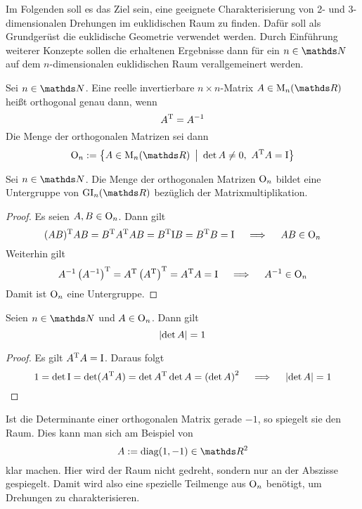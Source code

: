 		Im Folgenden soll es das Ziel sein, eine geeignete Charakterisierung von 2- und 3-dimensionalen Drehungen im euklidischen Raum zu finden.
		Dafür soll als Grundgerüst die euklidische Geometrie verwendet werden.
		Durch Einführung weiterer Konzepte sollen die erhaltenen Ergebnisse dann für ein $n\in\SN$ auf dem $n$-dimensionalen euklidischen Raum verallgemeinert werden.

		\begin{definition}
			Sei $n\in\SN$. 
			Eine reelle invertierbare $n\times n$-Matrix $A\in \m{M}_n(\SR)$ heißt orthogonal genau dann, wenn
			\[
				A^\mathrm{T} = A^{-1}
			\]
			Die Menge der orthogonalen Matrizen sei dann
			\[
				\m{O}_n := \set{A\in \m{M}_n(\SR)}{\det A \neq 0,\ A\transp A=\idmat}
			\]
		\end{definition}

		\begin{lemma}
			Sei $n\in\SN$.
			Die Menge der orthogonalen Matrizen $\mathrm{O}_n$ bildet eine Untergruppe von $\m{GI}_n(\SR)$ bezüglich der Matrixmultiplikation.

		\end{lemma}
		\begin{proof}
			Es seien $A,B\in \mathrm{O}_n$. Dann gilt
			\[
				(AB)^\mathrm{T} AB = B^\mathrm{T} A^\mathrm{T} AB = B^\mathrm{T} \mathrm{I} B = B^\mathrm{T} B = \mathrm{I} \quad \implies \quad AB\in \mathrm{O}_n
			\]
			Weiterhin gilt
			\[
				A^{-1}\left( A^{-1} \right)^\mathrm{T}  = A^\mathrm{T} \left( A^\mathrm{T} \right)^\mathrm{T} = A^\mathrm{T} A = \mathrm{I} \quad \implies \quad A^{-1}\in \mathrm{O}_n
			\]
			Damit ist $\mathrm{O}_n$ eine Untergruppe.
		\end{proof}

		\begin{proposition}
			Seien $n\in\SN$ und $A\in \mathrm{O}_n$. Dann gilt
			\[
				\left\vert \det A \right\vert = 1
			\]
		\end{proposition}
		\begin{proof}
			Es gilt $A^\mathrm{T} A=\mathrm{I}$. Daraus folgt
			\[
				1 = \det\mathrm{I} = \det (A^\mathrm{T} A) = \det A^\mathrm{T} \det A = \left( \det A \right)^2 \quad \implies \quad \left\vert \det A \right\vert = 1
			\]
		\end{proof}

		Ist die Determinante einer orthogonalen Matrix gerade $-1$, so spiegelt sie den Raum.
		Dies kann man sich am Beispiel von
		\[
			A:=\diag(1,-1)\in\SR^2
		\]
		klar machen.
		Hier wird der Raum nicht gedreht, sondern nur an der Abszisse gespiegelt.
		Damit wird also eine spezielle Teilmenge aus $\mathrm{O}_n$ benötigt, um Drehungen zu charakterisieren.

